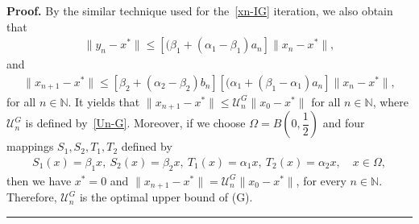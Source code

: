 \documentclass[a4paper, 11pt]{article}
\newenvironment{proof}[1][Proof]{\textbf{#1.} }{\hfill\rule{0.5em}{0.5em}}
\begin{document}
\begin{proof}
By the similar technique used for the~\eqref{xn-IG} iteration, we also obtain that
\begin{align*}
\|y_n-x^*\| \le [(\beta_1 + (\alpha_1 - \beta_1)a_n]\|x_n - x^*\|,
\end{align*}
and
\begin{align*}
\|x_{n+1}-x^*\| \le [\beta_2 + (\alpha_2 - \beta_2)b_n][(\alpha_1 + (\beta_1 - \alpha_1)a_n]\|x_n - x^*\|,
\end{align*}
for all $n \in \mathbb{N}$. It yields that $\|x_{n+1}-x^*\| \le \mathcal{U}_n^{G}\|x_0-x^*\|$ for all $n \in \mathbb{N}$, where $\mathcal{U}_n^{G}$ is defined by~\eqref{Un-G}. Moreover, if we choose $\Omega=B\left(0,\dfrac{1}{2}\right)$ and four mappings $S_1,S_2,T_1,T_2$ defined by
\begin{align*}
S_1(x)=\beta_1 x, \ S_2(x)=\beta_2x, \ T_1(x)=\alpha_1x, \ T_2(x)=\alpha_2x, \quad x \in \Omega,
\end{align*}
then we have $x^*=0$ and $\|x_{n+1}-x^*\|=\mathcal{U}_n^G\|x_0-x^*\|$, for every $n \in \mathbb{N}$. Therefore, $\mathcal{U}_n^G$ is the optimal upper bound of (G). \\


\end{proof}
\end{document}
